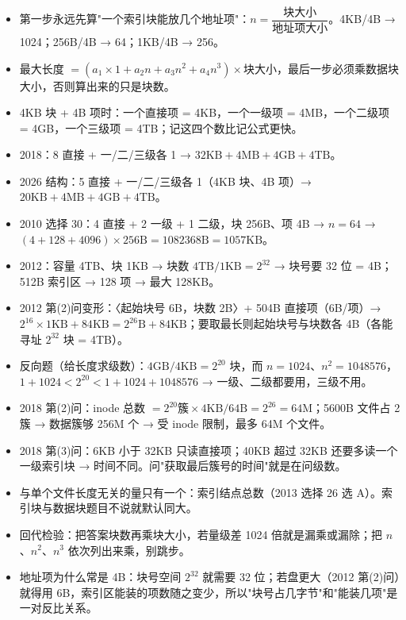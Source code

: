 \documentclass[10pt,a4paper]{ctexart}
\begin{document}
\begin{itemize}

\item 第一步永远先算"一个索引块能放几个地址项"：$n=\dfrac{块大小}{地址项大小}$。4KB/4B → 1024；256B/4B → 64；1KB/4B → 256。

\item 最大长度 $=(a_1\times1+a_2n+a_3n^2+a_4n^3)\times 块大小$，最后一步必须乘数据块大小，否则算出来的只是块数。

\item 4KB 块 + 4B 项时：一个直接项 = 4KB，一个一级项 = 4MB，一个二级项 = 4GB，一个三级项 = 4TB；记这四个数比记公式更快。

\item 2018：8 直接 + 一/二/三级各 1 → $32\text{KB}+4\text{MB}+4\text{GB}+4\text{TB}$。

\item 2026 结构：5 直接 + 一/二/三级各 1（4KB 块、4B 项）→ $20\text{KB}+4\text{MB}+4\text{GB}+4\text{TB}$。

\item 2010 选择 30：4 直接 + 2 一级 + 1 二级，块 256B、项 4B → $n=64$ → $(4+128+4096)\times256\text{B}=1082368\text{B}=1057\text{KB}$。

\item 2012：容量 4TB、块 1KB → 块数 $4\text{TB}/1\text{KB}=2^{32}$ → 块号要 32 位 = 4B；512B 索引区 → 128 项 → 最大 128KB。

\item 2012 第(2)问变形：〈起始块号 6B，块数 2B〉+ 504B 直接项（6B/项）→ $2^{16}\times1\text{KB}+84\text{KB}=2^{26}\text{B}+84\text{KB}$；要取最长则起始块号与块数各 4B（各能寻址 $2^{32}$ 块 = 4TB）。

\item 反向题（给长度求级数）：$4\text{GB}/4\text{KB}=2^{20}$ 块，而 $n=1024$、$n^2=1048576$，$1+1024<2^{20}<1+1024+1048576$ → 一级、二级都要用，三级不用。

\item 2018 第(2)问：inode 总数 $=2^{20}\text{簇}\times4\text{KB}/64\text{B}=2^{26}=64\text{M}$；5600B 文件占 2 簇 → 数据簇够 256M 个 → 受 inode 限制，最多 64M 个文件。

\item 2018 第(3)问：6KB 小于 32KB 只读直接项；40KB 超过 32KB 还要多读一个一级索引块 → 时间不同。问"获取最后簇号的时间"就是在问级数。

\item 与单个文件长度无关的量只有一个：索引结点总数（2013 选择 26 选 A）。索引块与数据块题目不说就默认同大。

\item 回代检验：把答案块数再乘块大小，若量级差 1024 倍就是漏乘或漏除；把 $n$、$n^2$、$n^3$ 依次列出来乘，别跳步。

\item 地址项为什么常是 4B：块号空间 $2^{32}$ 就需要 32 位；若盘更大（2012 第(2)问）就得用 6B，索引区能装的项数随之变少，所以"块号占几字节"和"能装几项"是一对反比关系。

\end{itemize}
\end{document}
